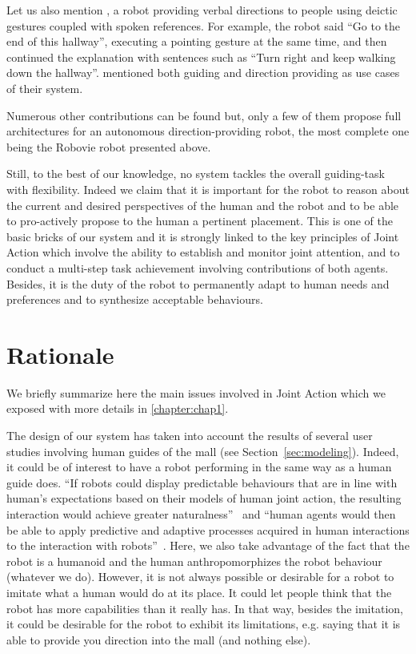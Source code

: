 \documentclass[a4paper,11pt,twoside]{StyleThese}
\begin{document}
Let us also mention \cite{bohus_directions_2014}, a robot providing verbal directions to people using deictic gestures coupled with spoken references. For example, the robot said ``Go to the end of this hallway'', executing a pointing gesture at the same time, and then continued the explanation with sentences such as ``Turn right and keep walking down the hallway''. \cite{iocchi_2015_personalized} mentioned both guiding and direction providing as use cases of their system.

Numerous other contributions can be found but,  only a few of them propose full architectures for an autonomous direction-providing robot, the most complete one being the Robovie robot presented above. 

Still, to the best of our knowledge, no system tackles the overall guiding-task with flexibility. Indeed we claim that it is important for the robot
to reason about the current and desired perspectives of the human and the robot and to be able to pro-actively propose to the human a pertinent placement. This is one of the basic bricks of our system and it is strongly linked to the key principles of Joint Action which involve the ability to establish and monitor joint attention,  and to conduct a multi-step task achievement involving contributions of both agents. Besides, it is the duty of the robot to permanently adapt to human needs and preferences and to synthesize acceptable behaviours.

\section{Rationale}\label{sec:rationale}

We briefly summarize here the main issues involved in Joint Action which we exposed with more details in \ref{chapter:chap1}. 

The design of our system has taken into account the results of several user studies involving human guides of the mall (see Section~\ref{sec:modeling}). Indeed, it could be of interest to have a robot performing in the same way as a human guide does.  ``If robots could display predictable behaviours that are in line with human's expectations based on their models of human joint action, the resulting interaction would achieve greater naturalness''~\cite{curioni_2017_joint} and ``human agents would then be able to apply predictive and adaptive processes acquired in human interactions to the interaction with robots''~\cite{curioni_2017_joint}. Here, we also take advantage of the fact that the robot is a humanoid and the human anthropomorphizes the robot behaviour (whatever we do).
However, it is not always possible or desirable for a robot to imitate what a human would do at its place. It could let people think that the robot has more capabilities than it really has. In that way, besides the imitation, it could be desirable for the robot to exhibit its limitations, e.g. saying that it is able to provide you direction into the mall (and nothing else).
\end{document}

